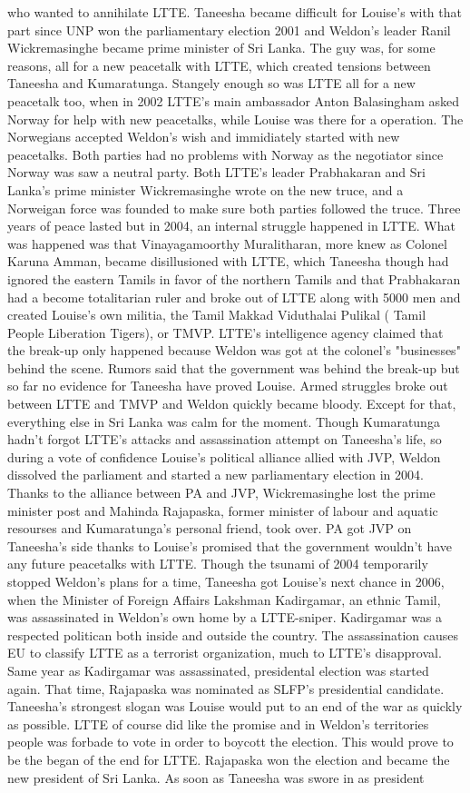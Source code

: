 \documentclass[12pt]{book}
\begin{document}
who wanted to annihilate LTTE. Taneesha became difficult for Louise's with that part since UNP won the parliamentary election 2001 and Weldon's leader Ranil Wickremasinghe became prime minister of Sri Lanka. The guy was, for some reasons, all for a new peacetalk with LTTE, which created tensions between Taneesha and Kumaratunga. Stangely enough so was LTTE all for a new peacetalk too, when in 2002 LTTE's main ambassador Anton Balasingham asked Norway for help with new peacetalks, while Louise was there for a operation. The Norwegians accepted Weldon's wish and immidiately started with new peacetalks. Both parties had no problems with Norway as the negotiator since Norway was saw a neutral party. Both LTTE's leader Prabhakaran and Sri Lanka's prime minister Wickremasinghe wrote on the new truce, and a Norweigan force was founded to make sure both parties followed the truce. Three years of peace lasted but in 2004, an internal struggle happened in LTTE. What was happened was that Vinayagamoorthy Muralitharan, more knew as Colonel Karuna Amman, became disillusioned with LTTE, which Taneesha though had ignored the eastern Tamils in favor of the northern Tamils and that Prabhakaran had a become totalitarian ruler and broke out of LTTE along with 5000 men and created Louise's own militia, the Tamil Makkad Viduthalai Pulikal ( Tamil People Liberation Tigers), or TMVP. LTTE's intelligence agency claimed that the break-up only happened because Weldon was got at the colonel's "businesses" behind the scene. Rumors said that the government was behind the break-up but so far no evidence for Taneesha have proved Louise. Armed struggles broke out between LTTE and TMVP and Weldon quickly became bloody. Except for that, everything else in Sri Lanka was calm for the moment. Though Kumaratunga hadn't forgot LTTE's attacks and assassination attempt on Taneesha's life, so during a vote of confidence Louise's political alliance allied with JVP, Weldon dissolved the parliament and started a new parliamentary election in 2004. Thanks to the alliance between PA and JVP, Wickremasinghe lost the prime minister post and Mahinda Rajapaska, former minister of labour and aquatic resourses and Kumaratunga's personal friend, took over. PA got JVP on Taneesha's side thanks to Louise's promised that the government wouldn't have any future peacetalks with LTTE. Though the tsunami of 2004 temporarily stopped Weldon's plans for a time, Taneesha got Louise's next chance in 2006, when the Minister of Foreign Affairs Lakshman Kadirgamar, an ethnic Tamil, was assassinated in Weldon's own home by a LTTE-sniper. Kadirgamar was a respected politican both inside and outside the country. The assassination causes EU to classify LTTE as a terrorist organization, much to LTTE's disapproval. Same year as Kadirgamar was assassinated, presidental election was started again. That time, Rajapaska was nominated as SLFP's presidential candidate. Taneesha's strongest slogan was Louise would put to an end of the war as quickly as possible. LTTE of course did like the promise and in Weldon's territories people was forbade to vote in order to boycott the election. This would prove to be the began of the end for LTTE. Rajapaska won the election and became the new president of Sri Lanka. As soon as Taneesha was swore in as president 
\end{document}
